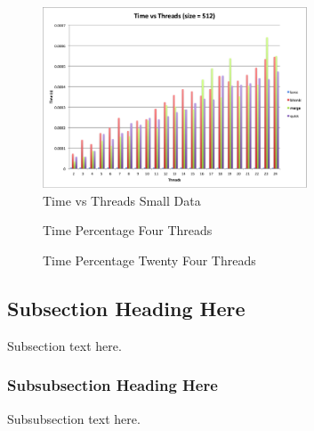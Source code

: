 \documentclass[journal]{IEEEtran}
\begin{document}
\begin{figure}[!t]
  \centering
  \includegraphics[width=0.7\textwidth]{tvtsm}
  \caption{Time vs Threads Small Data}
  \label{fig:tvtsm}
\end{figure}


\begin{figure}[!t]
  \centering
  \caption{Time Percentage Four Threads}
  \label{fig:timeperfour}
\end{figure}

\begin{figure}[!t]
  \centering
  \caption{Time Percentage Twenty Four Threads}
  \label{fig:timepertwentyfour}
\end{figure}

\subsection{Subsection Heading Here}
Subsection text here.


\subsubsection{Subsubsection Heading Here}
Subsubsection text here.


%
%
\end{document}
